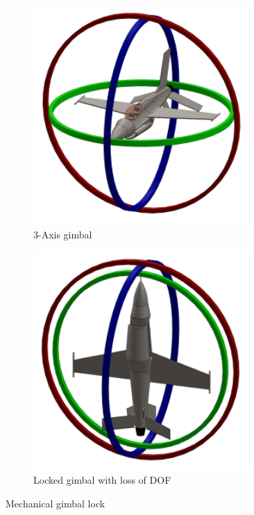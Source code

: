 \begin{figure}[htbp]
\begin{subfigure}{0.5\textwidth}
\centering
\includegraphics[width=0.9\textwidth]{figs/gimbal}
\caption{3-Axis gimbal}
\label{fig:gimbal}
\end{subfigure}
\begin{subfigure}{0.5\textwidth}
\centering
\includegraphics[width=0.9\textwidth]{figs/gimbal-lock}
\caption{Locked gimbal with loss of DOF}
\label{fig:gimbal-lock}
\end{subfigure}
\caption{Mechanical gimbal lock}
\vspace{-15pt}
\end{figure} 

